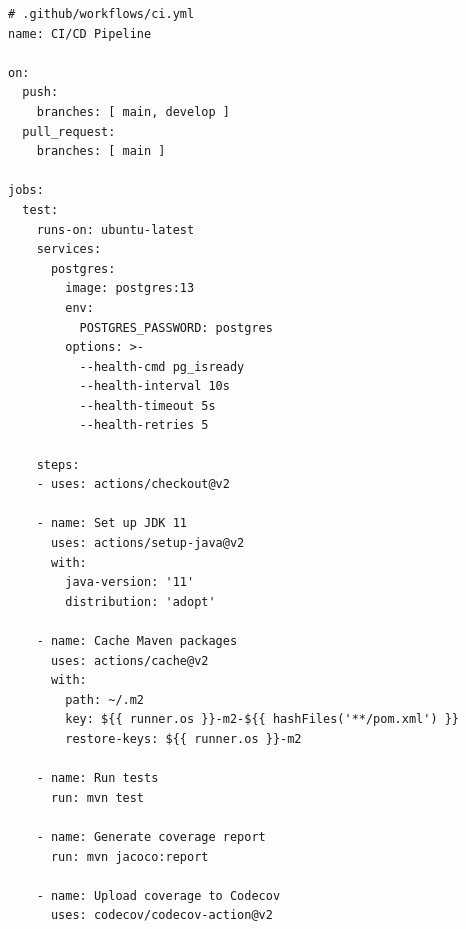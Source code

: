 \begin{lstlisting}
# .github/workflows/ci.yml
name: CI/CD Pipeline

on:
  push:
    branches: [ main, develop ]
  pull_request:
    branches: [ main ]

jobs:
  test:
    runs-on: ubuntu-latest
    services:
      postgres:
        image: postgres:13
        env:
          POSTGRES_PASSWORD: postgres
        options: >-
          --health-cmd pg_isready
          --health-interval 10s
          --health-timeout 5s
          --health-retries 5

    steps:
    - uses: actions/checkout@v2
    
    - name: Set up JDK 11
      uses: actions/setup-java@v2
      with:
        java-version: '11'
        distribution: 'adopt'
    
    - name: Cache Maven packages
      uses: actions/cache@v2
      with:
        path: ~/.m2
        key: ${{ runner.os }}-m2-${{ hashFiles('**/pom.xml') }}
        restore-keys: ${{ runner.os }}-m2
    
    - name: Run tests
      run: mvn test
    
    - name: Generate coverage report
      run: mvn jacoco:report
    
    - name: Upload coverage to Codecov
      uses: codecov/codecov-action@v2
\end{lstlisting}
